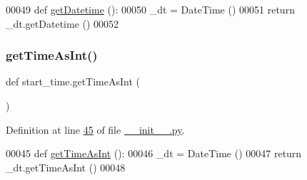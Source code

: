 \begin{DoxyCode}
00049 \textcolor{keyword}{def }\hyperlink{namespacestart__time_a52171f611eeff20ff03fd88c834220b0}{getDatetime} ():
00050     \_dt = DateTime ()
00051     \textcolor{keywordflow}{return} \_dt.getDatetime ()
00052 
\end{DoxyCode}
\mbox{\label{namespacestart__time_a822927985dec03d75bfdf136d6ac6a97}} 
\subsubsection{\texorpdfstring{get\+Time\+As\+Int()}{getTimeAsInt()}}
{\footnotesize\ttfamily def start\+\_\+time.\+get\+Time\+As\+Int (\begin{DoxyParamCaption}{ }\end{DoxyParamCaption})}



Definition at line \hyperlink{start__time_2____init_____8py_source_l00045}{45} of file \hyperlink{start__time_2____init_____8py_source}{\+\_\+\+\_\+init\+\_\+\+\_\+.\+py}.


\begin{DoxyCode}
00045 \textcolor{keyword}{def }\hyperlink{namespacestart__time_a822927985dec03d75bfdf136d6ac6a97}{getTimeAsInt} ():
00046     \_dt = DateTime ()
00047     \textcolor{keywordflow}{return} \_dt.getTimeAsInt ()
00048 
\end{DoxyCode}
